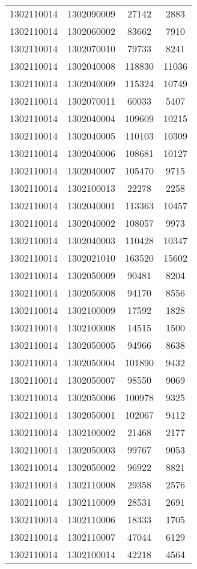 \begin{longtable}{llcc}
1302110014 & 1302090009 & 27142 & 2883\\
1302110014 & 1302060002 & 83662 & 7910\\
1302110014 & 1302070010 & 79733 & 8241\\
1302110014 & 1302040008 & 118830 & 11036\\
1302110014 & 1302040009 & 115324 & 10749\\
1302110014 & 1302070011 & 60033 & 5407\\
1302110014 & 1302040004 & 109609 & 10215\\
1302110014 & 1302040005 & 110103 & 10309\\
1302110014 & 1302040006 & 108681 & 10127\\
1302110014 & 1302040007 & 105470 & 9715\\
1302110014 & 1302100013 & 22278 & 2258\\
1302110014 & 1302040001 & 113363 & 10457\\
1302110014 & 1302040002 & 108057 & 9973\\
1302110014 & 1302040003 & 110428 & 10347\\
1302110014 & 1302021010 & 163520 & 15602\\
1302110014 & 1302050009 & 90481 & 8204\\
1302110014 & 1302050008 & 94170 & 8556\\
1302110014 & 1302100009 & 17592 & 1828\\
1302110014 & 1302100008 & 14515 & 1500\\
1302110014 & 1302050005 & 94966 & 8638\\
1302110014 & 1302050004 & 101890 & 9432\\
1302110014 & 1302050007 & 98550 & 9069\\
1302110014 & 1302050006 & 100978 & 9325\\
1302110014 & 1302050001 & 102067 & 9412\\
1302110014 & 1302100002 & 21468 & 2177\\
1302110014 & 1302050003 & 99767 & 9053\\
1302110014 & 1302050002 & 96922 & 8821\\
1302110014 & 1302110008 & 29358 & 2576\\
1302110014 & 1302110009 & 28531 & 2691\\
1302110014 & 1302110006 & 18333 & 1705\\
1302110014 & 1302110007 & 47044 & 6129\\
1302110014 & 1302100014 & 42218 & 4564\\

\end{longtable}
